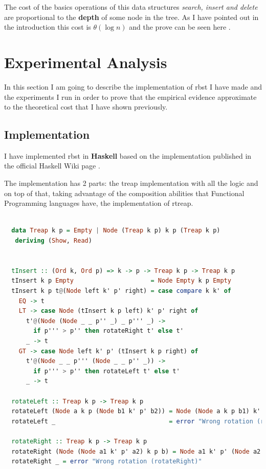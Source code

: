 \documentclass[12pt, a4paper]{article}
\begin{document}
The cost of the basics operations of this data structures \textit{search, insert and delete} are proportional to the \textbf{depth} of some node in  the tree. As I have pointed out in the introduction this cost is $\theta(\log n)$ and the prove can be seen here \cite{cormen}.

\section{Experimental Analysis}
In this section I am going to describe the implementation of \acrshort{rbst} I have made and the experiments I run in order to prove that the empirical evidence approximate to the theoretical cost that I have shown previously.

\subsection{Implementation}
I have implemented \acrshort{rbst} in \textbf{Haskell} based on the implementation published in the official Haskell Wiki page \cite{haskell_impl}.

The implementation has 2 parts: the \acrshort{treap} implementation with all the logic and on top of that, taking advantage of the composition abilities that Functional Programming languages have, the implementation of \acrshort{rtreap}.


\begin{lstlisting}[language=Haskell,title={\textbf{RandomBST.hs} - Treap Implementation with Insert function}]

  data Treap k p = Empty | Node (Treap k p) k p (Treap k p)
   deriving (Show, Read)


  tInsert :: (Ord k, Ord p) => k -> p -> Treap k p -> Treap k p
  tInsert k p Empty                     = Node Empty k p Empty
  tInsert k p t@(Node left k' p' right) = case compare k k' of
    EQ -> t
    LT -> case Node (tInsert k p left) k' p' right of
      t'@(Node (Node _ _ p'' _) _ p''' _) ->
        if p''' > p'' then rotateRight t' else t'
      _ -> t
    GT -> case Node left k' p' (tInsert k p right) of
      t'@(Node _ _ p''' (Node _ _ p'' _)) ->
        if p''' > p'' then rotateLeft t' else t'
      _ -> t

  rotateLeft :: Treap k p -> Treap k p
  rotateLeft (Node a k p (Node b1 k' p' b2)) = Node (Node a k p b1) k' p' b2
  rotateLeft _                               = error "Wrong rotation (rotateLeft)"

  rotateRight :: Treap k p -> Treap k p
  rotateRight (Node (Node a1 k' p' a2) k p b) = Node a1 k' p' (Node a2 k p b)
  rotateRight _ = error "Wrong rotation (rotateRight)"

\end{lstlisting}
\end{document}
